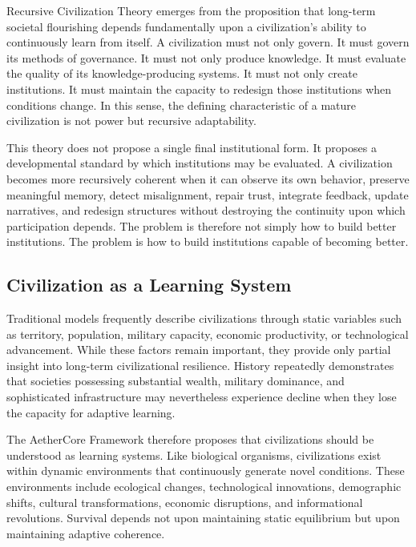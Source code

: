 \documentclass[12pt]{article}
\begin{document}
Recursive Civilization Theory emerges from the proposition that long-term societal flourishing depends fundamentally upon a civilization's ability to continuously learn from itself. A civilization must not only govern. It must govern its methods of governance. It must not only produce knowledge. It must evaluate the quality of its knowledge-producing systems. It must not only create institutions. It must maintain the capacity to redesign those institutions when conditions change. In this sense, the defining characteristic of a mature civilization is not power but recursive adaptability.

This theory does not propose a single final institutional form. It proposes a developmental standard by which institutions may be evaluated. A civilization becomes more recursively coherent when it can observe its own behavior, preserve meaningful memory, detect misalignment, repair trust, integrate feedback, update narratives, and redesign structures without destroying the continuity upon which participation depends. The problem is therefore not simply how to build better institutions. The problem is how to build institutions capable of becoming better.


\subsection{Civilization as a Learning System}

Traditional models frequently describe civilizations through static variables such as territory, population, military capacity, economic productivity, or technological advancement. While these factors remain important, they provide only partial insight into long-term civilizational resilience. History repeatedly demonstrates that societies possessing substantial wealth, military dominance, and sophisticated infrastructure may nevertheless experience decline when they lose the capacity for adaptive learning.

The AetherCore Framework therefore proposes that civilizations should be understood as learning systems. Like biological organisms, civilizations exist within dynamic environments that continuously generate novel conditions. These environments include ecological changes, technological innovations, demographic shifts, cultural transformations, economic disruptions, and informational revolutions. Survival depends not upon maintaining static equilibrium but upon maintaining adaptive coherence.
\end{document}
